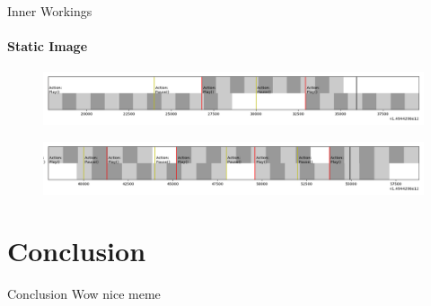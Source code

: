 \begin{frame}{Inner Workings}
    \framesubtitle{Static Image}
    \begin{figure}
        \centering
        \includegraphics[width=1\textwidth]{images/log_viz_1.png}
    \end{figure}
    \begin{figure}
        \centering
        \includegraphics[width=1\textwidth]{images/log_viz_2.png}
    \end{figure}
\end{frame}

\section{Conclusion}

\begin{frame}{Conclusion}
    Wow nice meme
\end{frame}

